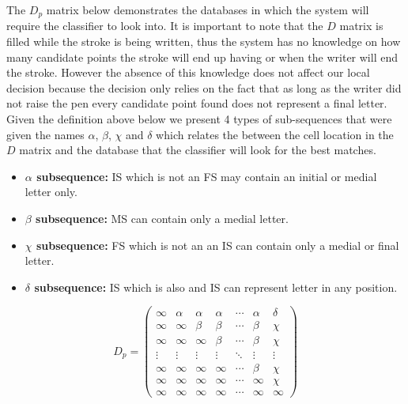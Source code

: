 \documentclass[journal,compsoc]{IEEEtran}
\begin{document}
The $D_p$ matrix below demonstrates the databases in which the system will require the classifier to look into. It is important to note that the $D$ matrix is filled while the stroke is being written, thus the system has no knowledge on how many candidate points the stroke will end up having or when the writer will end the stroke. However the absence of this knowledge does not affect our local decision because the decision only relies on the fact that as long as the writer did not raise the pen every candidate point found does not represent a final letter. Given the definition above below we present 4 types of sub-sequences that were given the names $\alpha$, $\beta$, $\chi$ and $\delta$ which relates the between the cell location in the $D$ matrix and the database that the classifier will look for the best matches.
\begin{itemize}
	\item \textbf{$\alpha$ subsequence:} IS which is not an FS may contain an initial or medial letter only.
	\item \textbf{$\beta$ subsequence:} MS can contain only a medial letter.
	\item \textbf{$\chi$ subsequence:} FS which is not an an IS can contain only a medial or final letter.
	\item \textbf{$\delta$ subsequence:} IS which is also and IS can represent letter in any position.
\end{itemize}

\begin{equation}
D_{p}=
\left( \begin{array}{ccccccc}
\infty 	& \alpha & \alpha & \alpha  & \cdots & \alpha & \delta \\
\infty  & \infty  & \beta   & \beta   & \cdots  & \beta  & \chi    \\
\infty  & \infty  & \infty   & \beta   & \cdots  & \beta  & \chi    \\
\vdots & \vdots & \vdots  & \vdots & \ddots  & \vdots & \vdots \\
\infty  & \infty  & \infty   & \infty   & \cdots  & \beta  & \chi    \\
\infty  & \infty  & \infty   & \infty   & \cdots  & \infty  & \chi    \\
\infty  & \infty  & \infty   & \infty   & \cdots  & \infty  & \infty \end{array} \right)
\label{dp_matrix}
\end{equation}
%
\end{document}
